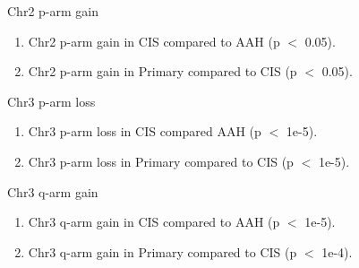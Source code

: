 \documentclass{beamer}
\begin{document}
\begin{frame}[allowframebreaks]
                \begin{block}{Chr2 p-arm gain}
                    \begin{enumerate}
                        \item Chr2 p-arm gain in CIS compared to AAH (p $<$ 0.05).
                        \item Chr2 p-arm gain in Primary compared to CIS (p $<$ 0.05).
                    \end{enumerate}

                    \begin{table}
                        \caption{CGC Tier1 genes in Chr2 p-arm}
                        \resizebox{\linewidth}{!}
                        {}
                    \end{table}
                \end{block}

                \begin{block}{Chr3 p-arm loss}
                    \begin{enumerate}
                        \item Chr3 p-arm loss in CIS compared AAH (p $<$ 1e-5).
                        \item Chr3 p-arm loss in Primary compared to CIS (p $<$ 1e-5).
                    \end{enumerate}

                    \begin{table}
                        \caption{CGC Tier1 genes in Chr3 p-arm}
                        \resizebox{\linewidth}{!}
                        {}
                    \end{table}
                \end{block}

                \begin{block}{Chr3 q-arm gain}
                    \begin{enumerate}
                        \item Chr3 q-arm gain in CIS compared to AAH (p $<$ 1e-5).
                        \item Chr3 q-arm gain in Primary compared to CIS (p $<$ 1e-4).
                    \end{enumerate}

                    \begin{table}
                        \caption{CGC Tier1 genes in Chr3 q-arm}
                        \resizebox{\linewidth}{!}
                        {}
                    \end{table}
                \end{block}


\end{frame}
\end{document}
